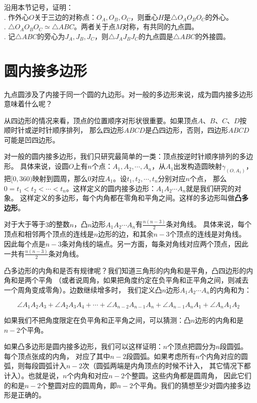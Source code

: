 \documentclass[12pt,UTF8]{ctexbook}
\begin{document}
\begin{xt}
    沿用本节记号，证明：\\
    . 作外心$O$关于三边的对称点：$O_A, O_B, O_C$，则垂心$H$是$\triangle O_AO_BO_C$的外心。\\
    . $\triangle O_AO_BO_C \simeq \triangle ABC$。两者关于点$M$对称，有共同的九点圆。\\
    . 记$\triangle ABC$的旁心为$J_A, J_B, J_C$，则$\triangle J_AJ_BJ_C$的九点圆是$\triangle ABC$的外接圆。
\end{xt}

\section{圆内接多边形}
九点圆涉及了内接于同一个圆的九边形。对一般的多边形来说，成为圆内接多边形意味着什么呢？

从四边形的情况来看，顶点的位置顺序对形状很重要。如果顶点$A$、$B$、$C$、$D$按顺时针或逆时针顺序排列，
那么四边形$ABCD$是凸四边形，否则，四边形$ABCD$可能是凹四边形。

对一般的圆内接多边形，我们只研究最简单的一类：顶点按逆时针顺序排列的多边形。
具体来说，设圆$O$上有$n$个点：$A_1, A_2, \cdots , A_n$，从$A_1$出发构造圆映射$\gamma_{(O,A_1)}$，
把$[0, 360)$映射到圆周，那么$0$对应$A_1$。设$t_1, t_2, \cdots , t_n$分别对应$n$个点，
那么$0 = t_1 < t_2 < \cdots < t_n$。这样定义的圆内接多边形：$A_1A_2\cdots A_n$就是我们研究的对象。
这样定义的多边形，每个内角都在零角和平角之间。这样的多边形叫做\textbf{凸多边形}。

对于大于等于$3$的整数$n$，凸$n$边形$A_1A_2\cdots A_n$有$\frac{n(n-3)}{2}$条对角线。
具体来说，每个顶点和相邻两个顶点的连线是$n$边形的边，和其余$n-3$个顶点的连线是对角线。
因此每个点是$n-3$条对角线的端点。另一方面，每条对角线对应两个顶点，因此一共有$\frac{n(n-3)}{2}$条对角线。

凸多边形的内角和是否有规律呢？我们知道三角形的内角和是平角，凸四边形的内角和是两个平角
（或者说周角，如果把角度约定在负平角和正平角之间，则减去一个周角变成零角）。边数继续增多时，
我们定义凸$n$边形$A_1A_2\cdots A_n$的内角和为：

$$ \angle A_1A_2A_3 + \angle A_2A_3A_4 + \cdots + \angle A_{n-2}A_{n-1}A_{n} + \angle A_{n-1}A_{n}A_{1}+ \angle A_{n}A_{1}A_{2}$$

如果我们不把角度限定在负平角和正平角之间，可以猜测：凸$n$边形的内角和是$n-2$个平角。

如果凸多边形是圆内接多边形，我们可以这样证明：$n$个顶点把圆分为$n$段圆弧。每个顶点张成的内角，
对应了其中$n-2$段圆弧。如果考虑所有$n$个内角对应的圆弧，则每段圆弧计入$n-2$次（圆弧两端是内角顶点的时候不计入，
其它情况下都计入）。也就是说，$n$个内角和对应$n-2$个整圆。这些内角都是圆周角，
因此它们的和是$n-2$个整圆对应的圆周角，即$n-2$个平角。我们的猜想至少对圆内接多边形是正确的。
\end{document}
